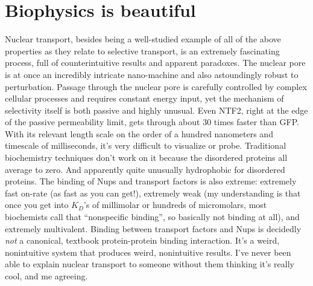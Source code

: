 \section{Biophysics is beautiful}

Nuclear transport, besides being a well-studied example of all of the above properties as they relate to selective transport, is an extremely fascinating process, full of counterintuitive results and apparent paradoxes.  The nuclear pore is at once an incredibly intricate nano-machine and also astoundingly robust to perturbation.  Passage through the nuclear pore is carefully controlled by complex cellular processes and requires constant energy input, yet the mechanism of selectivity itself is both passive and highly unusual.  Even NTF2, right at the edge of the passive permeability limit, gets through about 30 times faster than GFP.  With its relevant length scale on the order of a hundred nanometers and timescale of milliseconds, it's very difficult to visualize or probe.  Traditional biochemistry techniques don't work on it because the disordered proteins all average to zero.  And apparently quite unusually hydrophobic for disordered proteins.  The binding of Nups and transport factors is also extreme: extremely fast on-rate (as fast as you can get!), extremely weak (my understanding is that once you get into $K_D$'s of millimolar or hundreds of micromolars, most biochemists call that ``nonspecific binding'', so basically not binding at all), and extremely multivalent.  Binding between transport factors and Nups is decidedly \textit{not} a canonical, textbook protein-protein binding interaction.   It's a weird, nonintuitive system that produces weird, nonintuitive results.  I've never been able to explain nuclear transport to someone without them thinking it's really cool, and me agreeing.


